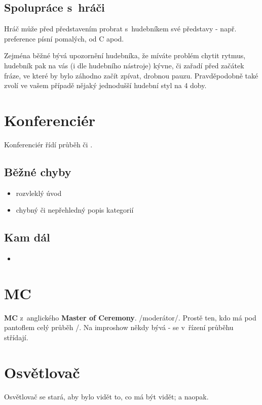 \subsection{Spolupráce s~hráči} Hráč může před představením probrat s~hudebníkem své představy - např. preference písní pomalých, od C apod. 
 
Zejména běžné bývá upozornění hudebníka, že míváte problém chytit rytmus, hudebník pak na vás (i dle hudebního nástroje) kývne, či zařadí před začátek fráze, ve které by bylo záhodno začít zpívat, drobnou pauzu. Pravděpodobně také zvolí ve vašem případě nějaký jednodušší hudební styl na 4 doby. 
 
 
\needspace{5cm} \section{Konferenciér} \label{konferenciér} Konferenciér řídí průběh  či . 
 
\subsection{Běžné chyby} \begin{itemize}
\item rozvleklý úvod
\item chybný či nepřehledný popis kategorií
\end{itemize}
 
\subsection{ Kam dál } \begin{itemize}
\item  {}
\end{itemize}
 
 
 
 
\needspace{5cm} \section{MC} \label{mc} \textbf{MC} z~anglického \textbf{Master of Ceremony}. /moderátor/. Prostě ten, kdo má pod pantoflem celý průběh /. 
Na improshow někdy bývá   -  se v~řízení průběhu střídají. 
 
 
\needspace{5cm} \section{Osvětlovač} \label{osvětlovač} Osvětlovač se stará, aby bylo vidět to, co má být vidět; a naopak. 
 
